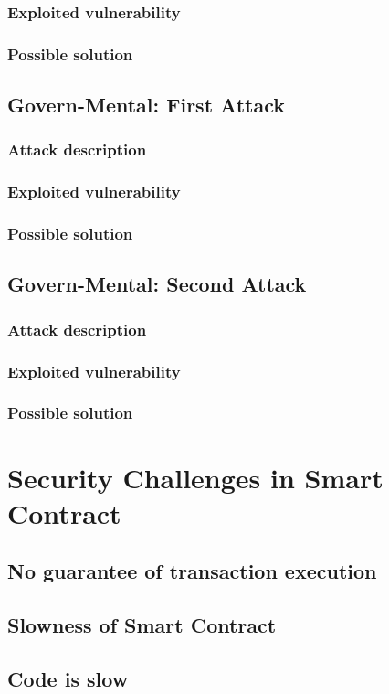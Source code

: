 \subsubsection{Exploited vulnerability}
\subsubsection{Possible solution}

\subsection{Govern-Mental: First Attack}
\subsubsection{Attack description}
\subsubsection{Exploited vulnerability}
\subsubsection{Possible solution}

\subsection{Govern-Mental: Second Attack}
\subsubsection{Attack description}
\subsubsection{Exploited vulnerability}
\subsubsection{Possible solution}

\section{Security Challenges in Smart Contract}
\subsection{No guarantee of transaction execution}
\subsection{Slowness of Smart Contract}
\subsection{Code is slow}